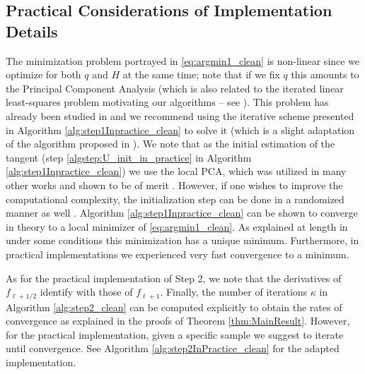 \documentclass[12pt]{article}
\theoremstyle{remark}
\begin{document}
\subsection{Practical Considerations of Implementation Details }\label{sec:practical}
The minimization problem portrayed in \eqref{eq:argmin1_clean} is non-linear since we optimize for both $q$ and $H$ at the same time; note that if we fix $q$ this amounts to the Principal Component Analysis (which is also related to the iterated linear least-squares problem motivating our algorithms -- see \cite{aizenbud2019approximating}).
This problem has already been studied in \cite{sober2017approximation,sober2016MMLS} and we recommend using the iterative scheme presented in Algorithm \ref{alg:step1Inpractice_clean} to solve it (which is a slight adaptation of the algorithm proposed in \cite{sober2016MMLS}). We note that as the initial estimation of the tangent (step \ref{algstep:U_init_in_practice} in Algorithm \ref{alg:step1Inpractice_clean}) we use the local PCA, which was utilized in many other works and shown to be of merit \cite{aamari2019nonasymptotic,aizenbud2015OutOfSample,kaslovsky2014non}. However, if one wishes to improve the computational complexity, the initialization step can be done in a randomized manner as well \cite{aizenbud2016SVD,halko2011algorithm}.
Algorithm \ref{alg:step1Inpractice_clean} can be shown to converge in theory to a local minimizer of \eqref{eq:argmin1_clean}. 
As explained at length in \cite{sober2016MMLS} under some conditions this minimization has a unique minimum. 
Furthermore, in practical implementations we experienced very fast convergence to a minimum.

As for the practical implementation of Step 2, we note that the derivatives of $f_{\ell + 1/2}$ identify with those of $f_{\ell +1}$.
Finally, the number of iterations $\kappa$ in Algorithm \ref{alg:step2_clean} can be computed explicitly to obtain the rates of convergence as explained in the proofs of Theorem \ref{thm:MainResult}.
However, for the practical implementation, given a specific sample we suggest to iterate until convergence.
See Algorithm \ref{alg:step2InPractice_clean} for the adapted implementation.
\end{document}
